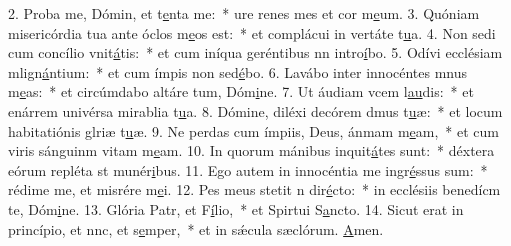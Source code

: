 2. Proba me, Dómin, et t\uline{e}nta me:~* ure renes mes et cor m\uline{e}um.
3. Quóniam misericórdia tua ante óclos m\uline{e}os est:~* et complácui in vertáte t\uline{u}a.
4. Non sedi cum concílio vnit\uline{á}tis:~* et cum iníqua geréntibus nn intro\uline{í}bo.
5. Odívi ecclésiam mlign\uline{á}ntium:~* et cum ímpis non sed\uline{é}bo.
6. Lavábo inter innocéntes mnus m\uline{e}as:~* et circúmdabo altáre tum, Dóm\uline{i}ne.
7. Ut áudiam vcem l\uline{au}dis:~* et enárrem univérsa mirablia t\uline{u}a.
8. Dómine, diléxi decórem dmus t\uline{u}æ:~* et locum habitatiónis glriæ t\uline{u}æ.
9. Ne perdas cum ímpiis, Deus, ánmam m\uline{e}am,~* et cum viris sánguinm vitam m\uline{e}am.
10. In quorum mánibus inquit\uline{á}tes sunt:~* déxtera eórum repléta st munér\uline{i}bus.
11. Ego autem in innocéntia me ingr\uline{é}ssus sum:~* rédime me, et misrére m\uline{e}i.
12. Pes meus stetit n dir\uline{é}cto:~* in ecclésiis benedícm te, Dóm\uline{i}ne.
13. Glória Patr, et F\uline{í}lio,~* et Spirtui S\uline{a}ncto.
14. Sicut erat in princípio, et nnc, et s\uline{e}mper,~* et in sǽcula sæclórum. \uline{A}men.
